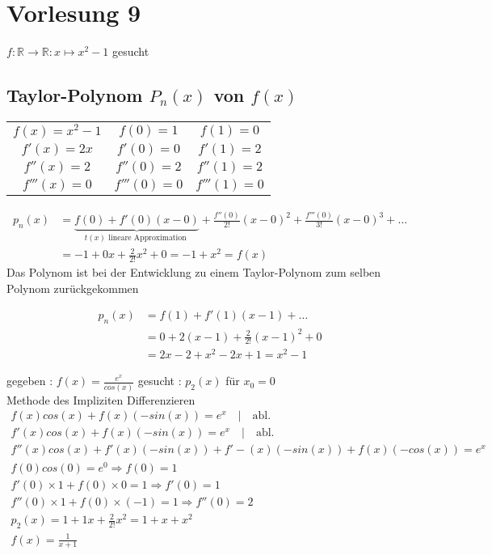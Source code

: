\section{Vorlesung 9}
\begin{example}
$f: \mathbb{R} \rightarrow \mathbb{R} : x \mapsto x^2-1 $ gesucht
\end{example}
\subsection{Taylor-Polynom $P_n(x)$ von $f(x)$}
\begin{center}
\begin{tabular}{ c c c }
$f(x)= x^2-1$  & $f(0) = 1 $     & $f(1) = 0$ \\ 
$f'(x) = 2x $  & $f'(0) = 0 $    & $f'(1) = 2$ \\  
$f''(x) = 2 $  & $f''(0) = 2 $   & $f''(1) = 2$  \\
$f'''(x) = 0 $ & $f'''(0) = 0 $  & $f'''(1) = 0$  
\end{tabular}
\end{center}

\begin{align*}
p_n(x) &= \underbrace{f(0) + f'(0)(x-0)}_{t(x) \text{ lineare Approximation }}  + \frac{f''(0)}{2!}(x-0)^2 + \frac{f'''(0)}{3!}(x-0)^3 + \dots\\
&= -1 + 0 x + \frac{2}{2!} x^2 + 0 = -1 + x^2 = f(x)
\end{align*}
Das Polynom ist bei der Entwicklung zu einem Taylor-Polynom zum selben Polynom zurückgekommen

\begin{align*}
p_n(x)&= f(1) + f'(1)(x-1)+ \dots \\
&= 0 + 2(x-1) + \frac{2}{2!}(x-1)^2 + 0 \\
&= 2x -2 + x^2 -2x +1 = x^2 -1
\end{align*} 

\begin{example}
gegeben : $f(x) = \frac{e^x}{cos(x)}$  gesucht : $p_2(x)$ für $x_0=0$\\
Methode des Impliziten Differenzieren 
\begin{gather*}
f(x) cos(x) + f(x)(-sin(x)) = e^x \quad | \quad \text{abl.} \\
f'(x) cos(x) + f(x)(-sin(x))= e^x \quad | \quad \text{abl.} \\
f''(x)cos(x) + f'(x)(-sin(x))+ f'-(x)(-sin(x)) + f(x)(- cos(x)) = e^x \\
f(0)cos(0) = e^0 \Rightarrow f(0) = 1\\
f'(0)\times 1 + f(0) \times 0 = 1 \Rightarrow f'(0) = 1\\
f''(0)\times 1 + f(0) \times (-1) = 1 \Rightarrow f''(0) = 2\\
p_2(x) = 1 + 1 x + \frac{2}{2!}x^2 = 1 + x + x^2\\
f(x) = \frac{1}{x+1}
\end{gather*}
\end{example}

